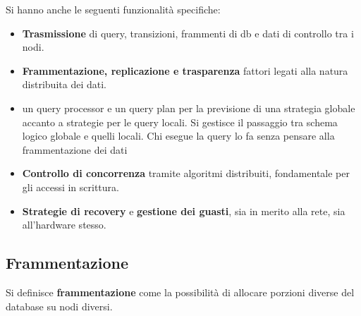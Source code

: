 Si hanno anche le seguenti funzionalità specifiche:
\begin{itemize}
    \item \textbf{Trasmissione} di query, transizioni, frammenti di db e dati
          di controllo tra i nodi.
    \item \textbf{Frammentazione, replicazione e trasparenza} fattori legati
          alla natura distribuita dei dati.
    \item un query processor e un query plan per la previsione di una
          strategia globale accanto a strategie per le query locali. Si gestisce
          il passaggio tra schema logico globale e quelli locali. Chi esegue
          la query lo fa senza pensare alla frammentazione dei dati
    \item \textbf{Controllo di concorrenza} tramite algoritmi distribuiti, fondamentale
          per gli accessi in scrittura.
    \item \textbf{Strategie di recovery} e \textbf{gestione dei guasti}, sia
          in merito alla rete, sia all'hardware stesso.
\end{itemize}

\subsection{Frammentazione}
\begin{definizione}
    Si definisce \textbf{frammentazione} come la possibilità di allocare porzioni
    diverse del database su nodi diversi.
\end{definizione}

